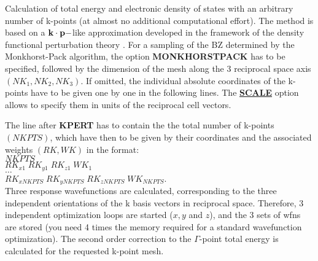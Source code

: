 \documentclass[twoside,10pt,titlepage,a4paper]{article}
\newcommand{\referto}[2]{\hyperlink{#1}{#2}}
\newcommand{\referto}[2]{\htmlref{#2}{#1}}
\newcommand{\refkeyword}[1]{%
\referto{#1}{\textbf{#1}}%
\index{#1}%
}%
\newcommand{\desc}[1]{%
   \hspace*{\fill} \parbox{130mm}{\sloppy
                          {#1}%
                             }
     \hfill\\\smallskip
   }%
\newcommand{\desc}[1]{#1\vspace{1ex}}
\begin{document}
  \desc{Calculation of total energy and electronic density of states with
    an arbitrary number of k-points (at almost no additional
    computational effort).  The method is based on a
    ${\bf k}\cdot {\bf p}-$like approximation developed in the framework
    of the density functional perturbation theory \cite{mimp}.
    For a sampling of the BZ determined by the Monkhorst-Pack algorithm,
    the option {\bf MONKHORSTPACK}
    has to be specified, followed by the
    dimension of the mesh along the 3 reciprocal space axis
    $(NK_{1} , NK_{2} , NK_{3})$.
    If omitted, the individual absolute coordinates of the k-points have
    to be given one by one in the following lines.
    The  \refkeyword{SCALE} option allows to specify them in units of
    the reciprocal cell vectors.

    The line after {\bf KPERT} has to contain the
    the total number of k-points $(NKPTS)$, which have then to be given by
    their coordinates and the associated weights $(RK,WK)$
    in the format: \\
    $NKPTS$ \\
    $RK_{x1} \; RK_{y1} \; RK_{z1} \; WK_{1}$ \\
    $\dots$\\
    $RK_{x NKPTS} \; RK_{y NKPTS} \; RK_{z NKPTS} \; WK_{NKPTS}$. \\
    Three response wavefunctions are calculated, corresponding to
    the three independent orientations of the
    k basis vectors in reciprocal space.
    Therefore, 3 independent optimization loops are started ($x,y$ and $z$),
    and the 3 sets of wfns are stored (you need 4 times the
    memory required for a standard wavefunction optimization).
    The second order correction to the $\Gamma$-point total energy
    is calculated for the requested k-point mesh.

}
\end{document}
